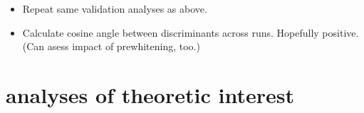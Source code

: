 \documentclass{article}\usepackage[]{graphicx}\usepackage[]{color}
\begin{document}
\begin{itemize}
  \item Repeat same validation analyses as above. 
  \item Calculate cosine angle between discriminants across runs. Hopefully positive. (Can asess impact of prewhitening, too.)
\end{itemize}


\section*{analyses of theoretic interest}



% 
% 
% 
% 
% 
% 
% 
% 
% 
% 
% 
% 
% 
% 
% 
\end{document}

